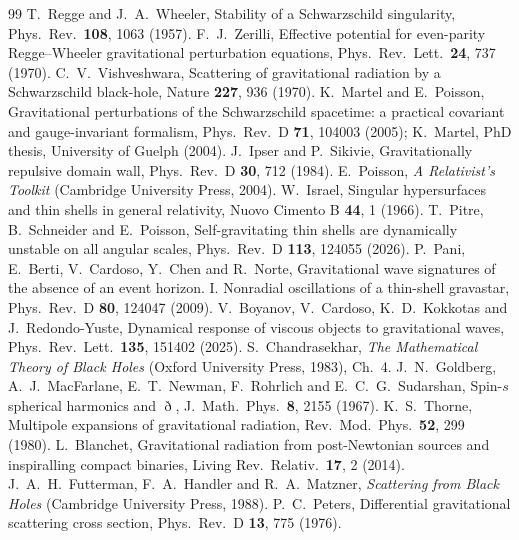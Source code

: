 \documentclass[11pt,a4paper]{article}
\numberwithin{equation}{section}
\begin{document}
\begin{thebibliography}{99}\small
{} T.~Regge and J.~A.~Wheeler, Stability of a Schwarzschild singularity, Phys.\ Rev.\ \textbf{108}, 1063 (1957).
 F.~J.~Zerilli, Effective potential for even-parity Regge--Wheeler gravitational perturbation equations, Phys.\ Rev.\ Lett.\ \textbf{24}, 737 (1970).
 C.~V.~Vishveshwara, Scattering of gravitational radiation by a Schwarzschild black-hole, Nature \textbf{227}, 936 (1970).
 K.~Martel and E.~Poisson, Gravitational perturbations of the Schwarzschild spacetime: a practical covariant and gauge-invariant formalism, Phys.\ Rev.\ D \textbf{71}, 104003 (2005); K.~Martel, PhD thesis, University of Guelph (2004).
 J.~Ipser and P.~Sikivie, Gravitationally repulsive domain wall, Phys.\ Rev.\ D \textbf{30}, 712 (1984).
 E.~Poisson, \emph{A Relativist's Toolkit} (Cambridge University Press, 2004).
 W.~Israel, Singular hypersurfaces and thin shells in general relativity, Nuovo Cimento B \textbf{44}, 1 (1966).
 T.~Pitre, B.~Schneider and E.~Poisson, Self-gravitating thin shells are dynamically unstable on all angular scales, Phys.\ Rev.\ D \textbf{113}, 124055 (2026).
 P.~Pani, E.~Berti, V.~Cardoso, Y.~Chen and R.~Norte, Gravitational wave signatures of the absence of an event horizon. I. Nonradial oscillations of a thin-shell gravastar, Phys.\ Rev.\ D \textbf{80}, 124047 (2009).
 V.~Boyanov, V.~Cardoso, K.~D.~Kokkotas and J.~Redondo-Yuste, Dynamical response of viscous objects to gravitational waves, Phys.\ Rev.\ Lett.\ \textbf{135}, 151402 (2025).
 S.~Chandrasekhar, \emph{The Mathematical Theory of Black Holes} (Oxford University Press, 1983), Ch.~4.
 J.~N.~Goldberg, A.~J.~MacFarlane, E.~T.~Newman, F.~Rohrlich and E.~C.~G.~Sudarshan, Spin-$s$ spherical harmonics and $\eth$, J.\ Math.\ Phys.\ \textbf{8}, 2155 (1967).
 K.~S.~Thorne, Multipole expansions of gravitational radiation, Rev.\ Mod.\ Phys.\ \textbf{52}, 299 (1980).
 L.~Blanchet, Gravitational radiation from post-Newtonian sources and inspiralling compact binaries, Living Rev.\ Relativ.\ \textbf{17}, 2 (2014).
 J.~A.~H.~Futterman, F.~A.~Handler and R.~A.~Matzner, \emph{Scattering from Black Holes} (Cambridge University Press, 1988).
 P.~C.~Peters, Differential gravitational scattering cross section, Phys.\ Rev.\ D \textbf{13}, 775 (1976).

\end{thebibliography}
\end{document}
